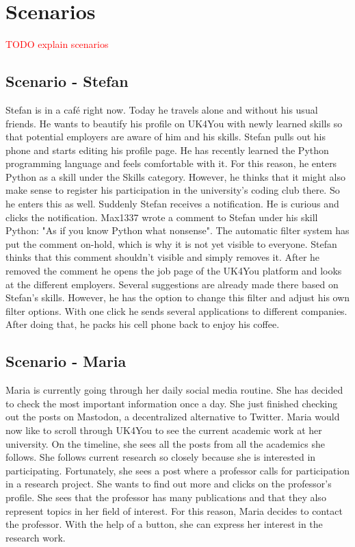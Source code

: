 \section{Scenarios}
\textcolor{red}{TODO explain scenarios}

\subsection{Scenario - Stefan}
Stefan is in a café right now.
Today he travels alone and without his usual friends.
He wants to beautify his profile on UK4You with newly learned skills so that potential employers are aware of him and his skills.
Stefan pulls out his phone and starts editing his profile page.
He has recently learned the Python programming language and feels comfortable with it.
For this reason, he enters Python as a skill under the Skills category.
However, he thinks that it might also make sense to register his participation in the university's coding club there.
So he enters this as well.
Suddenly Stefan receives a notification.
He is curious and clicks the notification.
Max1337 wrote a comment to Stefan under his skill Python: "As if you know Python what nonsense".
The automatic filter system has put the comment on-hold, which is why it is not yet visible to everyone.
Stefan thinks that this comment shouldn't visible and simply removes it.
After he removed the comment he opens the job page of the UK4You platform and looks at the different employers.
Several suggestions are already made there based on Stefan's skills.
However, he has the option to change this filter and adjust his own filter options.
With one click he sends several applications to different companies.
After doing that, he packs his cell phone back to enjoy his coffee.

\subsection{Scenario - Maria}
Maria is currently going through her daily social media routine.
She has decided to check the most important information once a day.
She just finished checking out the posts on Mastodon, a decentralized alternative to Twitter.
Maria would now like to scroll through UK4You to see the current academic work at her university.
On the timeline, she sees all the posts from all the academics she follows.
She follows current research so closely because she is interested in participating.
Fortunately, she sees a post where a professor calls for participation in a research project.
She wants to find out more and clicks on the professor's profile.
She sees that the professor has many publications and that they also represent topics in her field of interest.
For this reason, Maria decides to contact the professor.
With the help of a button, she can express her interest in the research work.
